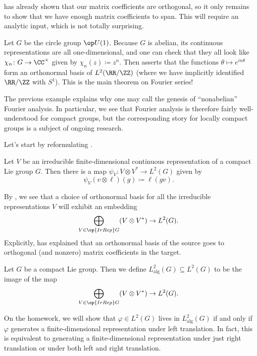 \documentclass[../notes.tex]{subfiles}
\begin{document}
 has already shown that our matrix coefficients are orthogonal, so it only remains to show that we have enough matrix coefficients to span. This will require an analytic input, which is not totally surprising.
\begin{example}
	Let $G$ be the circle group $\op U(1)$. Because $G$ is abelian, its continuous representations are all one-dimensional, and one can check that they all look like $\chi_n\colon G\to\CC^\times$ given by $\chi_n(z)\coloneqq z^n$. Then  asserts that the functions $\theta\mapsto e^{in\theta}$ form an orthonormal basis of $L^2(\RR/\ZZ)$ (where we have implicitly identified $\RR/\ZZ$ with $S^1$). This is the main theorem on Fourier series!
\end{example}
\begin{remark}
	The previous example explains why one may call  the genesis of ``nonabelian'' Fourier analysis. In particular, we see that Fourier analysis is therefore fairly well-understood for compact groups, but the corresponding story for locally compact groups is a subject of ongoing research.
\end{remark}
Let's start by reformulating .
\begin{notation}
	Let $V$ be an irreducible finite-dimensional continuous representation of a compact Lie group $G$. Then there is a map $\psi_V\colon V\otimes V^*\to L^2(G)$ given by
	\[\psi_V(v\otimes\ell)(g)\coloneqq\ell(gv).\]
\end{notation}
\begin{remark}
	By , we see that a choice of orthonormal basis for all the irreducible representations $V$ will exhibit an embedding
	\[\bigoplus_{V\in\op{IrRep}G}(V\otimes V^*)\to L^2(G).\]
	Explicitly,  has explained that an orthonormal basis of the source goes to orthogonal (and nonzero) matrix coefficients in the target.
\end{remark}
\begin{definition}
	Let $G$ be a compact Lie group. Then we define $L^2_{\mathrm{alg}}(G)\subseteq L^2(G)$ to be the image of the map
	\[\bigoplus_{V\in\op{IrRep}G}(V\otimes V^*)\to L^2(G).\]
\end{definition}
\begin{remark} \label{rem:better-alg}
	On the homework, we will show that $\varphi\in L^2(G)$ lives in $L^2_{\mathrm{alg}}(G)$ if and only if $\varphi$ generates a finite-dimensional representation under left translation. In fact, this is equivalent to generating a finite-dimensional representation under just right translation or under both left and right translation.
\end{remark}
\end{document}
